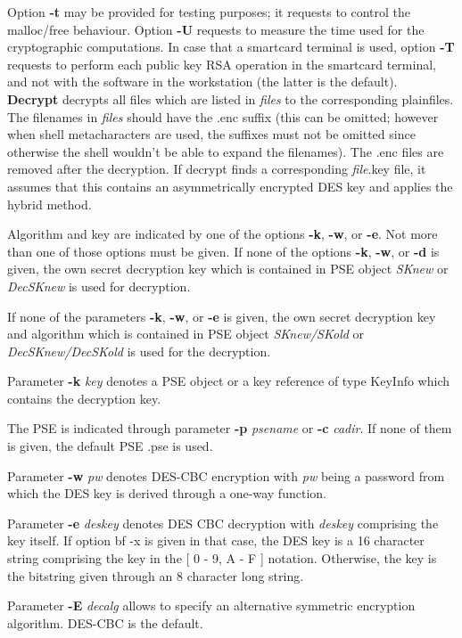 Option {\bf -t} may be provided for testing purposes; it requests to control the malloc/free behaviour.
Option {\bf -U} requests to measure the time used for the cryptographic computations. 
In case that a smartcard terminal is used, option {\bf -T} requests to perform each public key 
RSA operation in the smartcard terminal, and not with the software in the workstation 
(the latter is the default). 
\\ [1em]

{\large\bf Decrypt} decrypts all files which are listed in {\em files} to the corresponding
plainfiles. The filenames in {\em files} should have the .enc suffix (this can be omitted;
however when shell metacharacters are used, the suffixes must not be omitted since
otherwise the shell wouldn't be able to expand the filenames). The .enc files are
removed after the decryption. If decrypt
finds a corresponding {\em file}.key file, it assumes that this contains an asymmetrically
encrypted DES key and applies the hybrid method.
 
Algorithm and key are indicated by one of the options 
{\bf -k}, {\bf -w}, or {\bf -e}. Not more than one of those options 
must be given. If none of the options {\bf -k}, {\bf -w}, or {\bf -d} is given, the own
secret decryption key which is contained in PSE object {\em SKnew} or
{\em DecSKnew} is used for decryption. 

If none of the parameters {\bf -k}, {\bf -w}, or {\bf -e} is given, the own secret
decryption key and algorithm which is contained in PSE object {\em SKnew/SKold} or {\em 
DecSKnew/DecSKold}
is used for the decryption.
 
Parameter {\bf -k} {\em key} denotes a PSE object or a key reference of type KeyInfo
which contains the decryption key.
 
The PSE is indicated through parameter {\bf -p} {\em psename} or {\bf -c} {\em cadir}. If none of them
is given, the default PSE .pse is used.

Parameter {\bf -w} {\em pw} denotes DES-CBC encryption with {\em pw} being a password from which the 
DES key 
is derived through a one-way function.
 
Parameter {\bf -e} {\em deskey} denotes DES CBC decryption with {\em deskey} comprising the key itself.
If option {bf -x} is given in that case, the DES key is a 16 character string comprising
the key in the [ 0 - 9, A - F ] notation. Otherwise, the key is the bitstring given through
an 8 character long string.

Parameter {\bf -E} {\em decalg} allows to specify an alternative symmetric encryption algorithm.
DES-CBC is the default.

